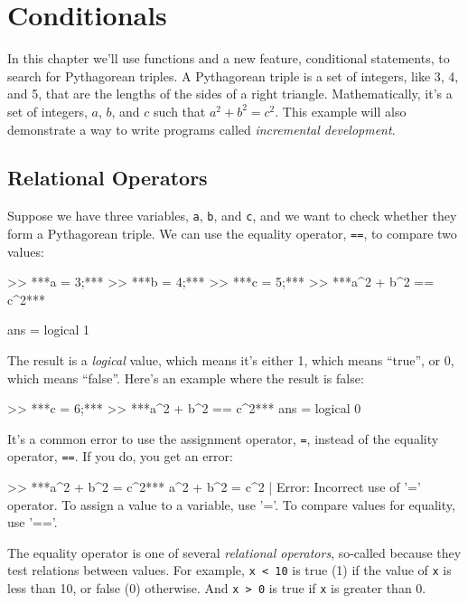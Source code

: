 \chapter{Conditionals}

In this chapter we'll use functions and a new feature, conditional statements, to search for Pythagorean triples.
A Pythagorean triple is a set of integers, like 3, 4, and 5,
that are the lengths of the sides of a right triangle.  Mathematically, it's a set of integers, $a$, $b$, and $c$ such that $a^2 + b^2 = c^2$.
This example will also demonstrate a way to write programs called {\em incremental development}.


\section{Relational Operators}

Suppose we have three variables, {\tt a}, {\tt b}, and {\tt c}, and we want to check whether they form a Pythagorean triple.  We can use the equality operator, {\tt ==}, to compare two values:

\begin{code}
>> ***a = 3;***
>> ***b = 4;***
>> ***c = 5;***
>> ***a^2 + b^2 == c^2***

ans = logical 1
\end{code}

The result is a {\em logical} value, which means it's either 1, which means ``true'', or 0, which means ``false''.  Here's an example where the result is false:

\begin{code}
>> ***c = 6;***
>> ***a^2 + b^2 == c^2***
ans = logical 0
\end{code}

It's a common error to use the assignment operator, {\tt =}, instead of the equality operator, {\tt ==}.  If you do, you get an error:

\begin{code}
>> ***a^2 + b^2 = c^2***
 a^2 + b^2 = c^2
           |
Error: Incorrect use of '=' operator. 
To assign a value to a variable, use '='. 
To compare values for equality, use '=='.
\end{code}

The equality operator is one of several {\em relational operators}, so-called because they test relations between values.
For example, {\tt x < 10} is true (1) if the value of {\tt x} is less than 10, or false (0) otherwise.  And {\tt x > 0} is true if {\tt x} is greater than 0.

